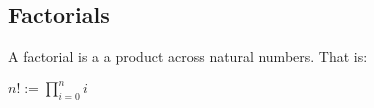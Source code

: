 
\subsection{Factorials}

A factorial is a a product across natural numbers. That is:

\(n!:=\prod^n_{i=0}i\)

